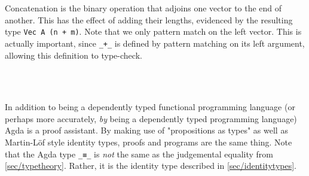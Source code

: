 Concatenation is the binary operation that adjoins one vector to the end of another.
This has the effect of adding their lengths, evidenced by the resulting type \texttt{Vec A (n + m)}.
Note that we only pattern match on the left vector. This is actually important, since \texttt{\_+\_} is defined
by pattern matching on its left argument, allowing this definition to type-check.
\begin{code}%
\>[0]\AgdaOperator{\AgdaFunction{\AgdaUnderscore{}++\AgdaUnderscore{}}}\AgdaSpace{}%
\AgdaSymbol{:}\AgdaSpace{}%
\AgdaSymbol{\{}\AgdaSpace{}%
\AgdaSymbol{:}\AgdaSpace{}%
\AgdaSymbol{\}}\AgdaSpace{}%
\AgdaSymbol{\{}\AgdaSpace{}%
\AgdaSpace{}%
\AgdaSymbol{:}\AgdaSpace{}%
\AgdaSymbol{\}}\AgdaSpace{}%
\AgdaSpace{}%
\AgdaSpace{}%
\AgdaSpace{}%
\AgdaSpace{}%
\AgdaSpace{}%
\AgdaSpace{}%
\AgdaSpace{}%
\AgdaSpace{}%
\AgdaSpace{}%
\AgdaSpace{}%
\AgdaSpace{}%
\AgdaSymbol{(}\AgdaSpace{}%
\AgdaOperator{\AgdaFunction{+}}\AgdaSpace{}%
\AgdaSymbol{)}\<%
\\
\>[0]\AgdaInductiveConstructor{[]}\AgdaSpace{}%
\AgdaOperator{\AgdaFunction{++}}\AgdaSpace{}%
\AgdaSpace{}%
\AgdaSymbol{=}\AgdaSpace{}%
\<%
\\
\>[0]\AgdaSymbol{(}\AgdaSpace{}%
\AgdaOperator{\AgdaInductiveConstructor{::}}\AgdaSpace{}%
\AgdaSymbol{)}\AgdaSpace{}%
\AgdaOperator{\AgdaFunction{++}}\AgdaSpace{}%
\AgdaSpace{}%
\AgdaSymbol{=}\AgdaSpace{}%
\AgdaSpace{}%
\AgdaOperator{\AgdaInductiveConstructor{::}}\AgdaSpace{}%
\AgdaSymbol{(}\AgdaSpace{}%
\AgdaOperator{\AgdaFunction{++}}\AgdaSpace{}%
\AgdaSymbol{)}\<%
\end{code}

In addition to being a dependently typed functional programming language
(or perhaps more accurately, \emph{by} being a dependently typed programming language)
Agda is a proof assistant. By making use of "propositions as types" as well as Martin-Löf style
identity types, proofs and programs are the same thing.
Note that the Agda type \texttt{\_≡\_} is \emph{not} the same as the judgemental equality from \autoref{sec/typetheory}.
Rather, it is the identity type described in \autoref{sec/identitytypes}.


